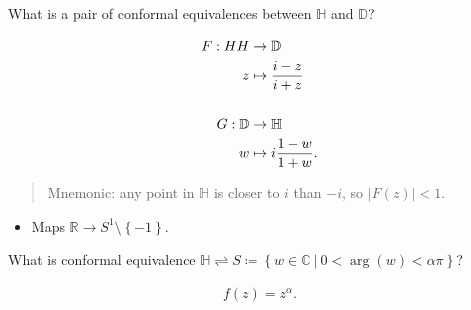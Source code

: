 \begin{problem}[?]

What is a pair of conformal equivalences between \({\mathbb{H}}\) and
\({\mathbb{D}}\)?

\begin{solution}

\begin{align*}
F: HH &\to {\mathbb{D}}\\
z & \mapsto {i-z \over i+z}
\\
\\
G: {\mathbb{D}}&\to {\mathbb{H}}\\
w &\mapsto i{1-w \over 1 + w}
.\end{align*}

\begin{quote}
Mnemonic: any point in \({\mathbb{H}}\) is closer to \(i\) than \(-i\),
so \({\left\lvert {F(z)} \right\rvert} < 1\).
\end{quote}

\begin{itemize}
\tightlist
\item
  Maps \({\mathbb{R}}\to S^1\setminus\left\{{-1}\right\}\).
\end{itemize}

\end{solution}

\end{problem}

\begin{problem}[?]

What is conformal equivalence
\({\mathbb{H}}\rightleftharpoons S \coloneqq\left\{{w\in {\mathbb{C}}{~\mathrel{\Big|}~}0 < \arg(w) < \alpha \pi}\right\}\)?

\begin{solution}

\begin{align*}
f(z) = z^ \alpha
.\end{align*}

\end{solution}

\end{problem}


\printbibliography[title=Bibliography]



